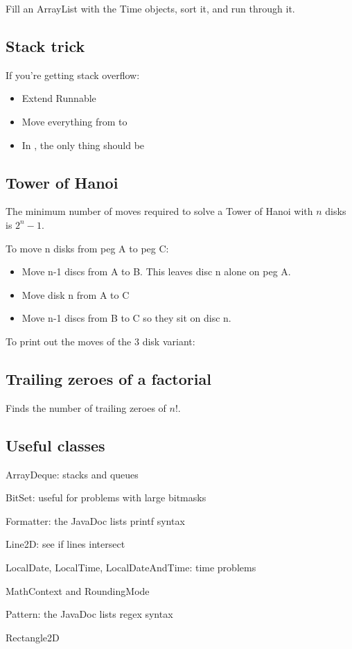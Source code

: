Fill an ArrayList with the Time objects, sort it, and run through it.

\subsection*{Stack trick}

If you're getting stack overflow:

\begin{itemize}
    \item Extend Runnable
    \item Move everything from  to 
    \item In , the only thing should be 
\end{itemize}

\subsection*{Tower of Hanoi}

The minimum number of moves required to solve a Tower of Hanoi with $n$ disks is $2^n - 1$.

To move n disks from peg A to peg C:

\begin{itemize}
    \item Move n-1 discs from A to B. This leaves disc n alone on peg A.
    \item Move disk n from A to C
    \item Move n-1 discs from B to C so they sit on disc n.
\end{itemize}

To print out the moves of the 3 disk variant:



\subsection*{Trailing zeroes of a factorial}

Finds the number of trailing zeroes of $n!$.



\subsection*{Useful classes}

ArrayDeque: stacks and queues

BitSet: useful for problems with large bitmasks

Formatter: the JavaDoc lists printf syntax

Line2D: see if lines intersect

LocalDate, LocalTime, LocalDateAndTime: time problems

MathContext and RoundingMode

Pattern: the JavaDoc lists regex syntax

Rectangle2D

\newpage